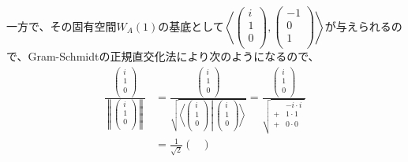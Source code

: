 \documentclass[dvipdfmx]{jsarticle}
\begin{document}
一方で、その固有空間$W_{A}(1)$の基底として$\left\langle \begin{pmatrix}
i \\
1 \\
0 \\
\end{pmatrix},\begin{pmatrix}
 - 1 \\
0 \\
1 \\
\end{pmatrix} \right\rangle$が与えられるので、Gram-Schmidtの正規直交化法により次のようになるので、
\begin{align*}
\frac{\begin{pmatrix}
i \\
1 \\
0 \\
\end{pmatrix}}{\left\| \begin{pmatrix}
i \\
1 \\
0 \\
\end{pmatrix} \right\|} &= \frac{\begin{pmatrix}
i \\
1 \\
0 \\
\end{pmatrix}}{\sqrt{\left\langle \begin{pmatrix}
i \\
1 \\
0 \\
\end{pmatrix} \middle| \begin{pmatrix}
i \\
1 \\
0 \\
\end{pmatrix} \right\rangle}} = \frac{\begin{pmatrix}
i \\
1 \\
0 \\
\end{pmatrix}}{\sqrt{\begin{matrix}
\  & - i \cdot i \\
 + & 1 \cdot 1 \\
 + & 0 \cdot 0 \\
\end{matrix}}} \\
&= \frac{1}{\sqrt{2}}\begin{pmatrix}

\end{pmatrix}
\end{align*}
\end{document}
